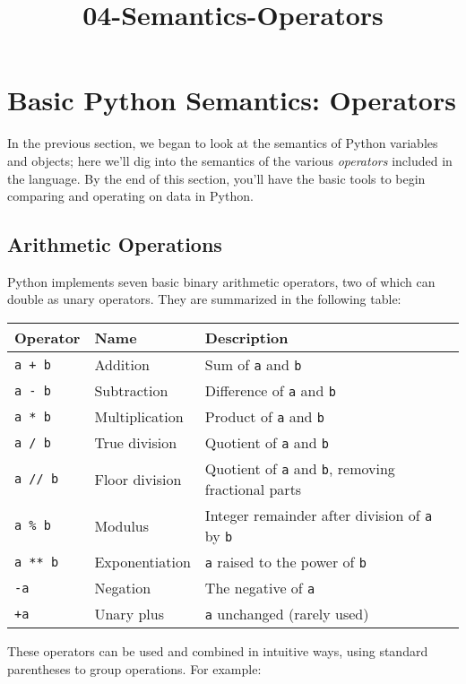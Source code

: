 \documentclass[11pt]{article}
\title{04-Semantics-Operators}
\begin{document}
    
    
    \maketitle
    
    

    
    \section{Basic Python Semantics:
Operators}\label{basic-python-semantics-operators}

    In the previous section, we began to look at the semantics of Python
variables and objects; here we'll dig into the semantics of the various
\emph{operators} included in the language. By the end of this section,
you'll have the basic tools to begin comparing and operating on data in
Python.

    \subsection{Arithmetic Operations}\label{arithmetic-operations}

Python implements seven basic binary arithmetic operators, two of which
can double as unary operators. They are summarized in the following
table:

\begin{longtable}[c]{@{}lll@{}}
\toprule
Operator & Name & Description\tabularnewline
\midrule
\endhead
\texttt{a\ +\ b} & Addition & Sum of \texttt{a} and
\texttt{b}\tabularnewline
\texttt{a\ -\ b} & Subtraction & Difference of \texttt{a} and
\texttt{b}\tabularnewline
\texttt{a\ *\ b} & Multiplication & Product of \texttt{a} and
\texttt{b}\tabularnewline
\texttt{a\ /\ b} & True division & Quotient of \texttt{a} and
\texttt{b}\tabularnewline
\texttt{a\ //\ b} & Floor division & Quotient of \texttt{a} and
\texttt{b}, removing fractional parts\tabularnewline
\texttt{a\ \%\ b} & Modulus & Integer remainder after division of
\texttt{a} by \texttt{b}\tabularnewline
\texttt{a\ **\ b} & Exponentiation & \texttt{a} raised to the power of
\texttt{b}\tabularnewline
\texttt{-a} & Negation & The negative of \texttt{a}\tabularnewline
\texttt{+a} & Unary plus & \texttt{a} unchanged (rarely
used)\tabularnewline
\bottomrule
\end{longtable}

These operators can be used and combined in intuitive ways, using
standard parentheses to group operations. For example:
\end{document}
